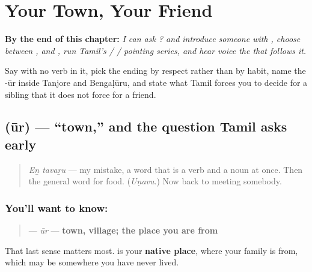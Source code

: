 
\chapter{Your Town, Your Friend}
\label{ch:ta-your-town-your-friend}

\begin{chapteropening}
\textbf{By the end of this chapter:} \emph{I can ask   ? and introduce someone with   , choose between ,  and , run Tamil's  /  /  pointing series, and hear  voice the  that follows it.}

Say    with no verb in it, pick the ending by respect rather than by habit, name the -ūr inside Tanjore and Bengaḷūru, and state what Tamil forces you to decide for a sibling that it does not force for a friend.
\end{chapteropening}

\section[\texorpdfstring{\ta{ஊர்} (ūr)}{ஊர் (ūr)}]{ (ūr) — \textquotedblleft{}town,\textquotedblright{} and the question Tamil asks early}

\label{lesson:TA-C37-uur}



\begin{quote}
\emph{Eṉ tavaṟu} — my mistake, a word that is a verb and a noun at once. Then the general word for food. (\emph{Uṇavu}.) Now back to meeting somebody.
\end{quote}

\subsection*{You'll want to know: }
\begin{quote}
\textbf{} — \emph{ūr} — \textbf{town, village; the place you are from}
\end{quote}

That last sense matters most. \textbf{ } is your \textbf{native place}, where your family is from, which may be somewhere you have never lived.

